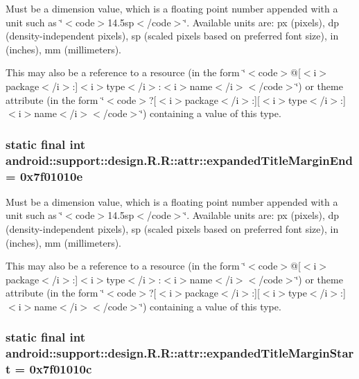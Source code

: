 Must be a dimension value, which is a floating point number appended with a unit such as \char`\"{}$<$code$>$14.5sp$<$/code$>$\char`\"{}. Available units are: px (pixels), dp (density-independent pixels), sp (scaled pixels based on preferred font size), in (inches), mm (millimeters). 

This may also be a reference to a resource (in the form \char`\"{}$<$code$>$@\mbox{[}$<$i$>$package$<$/i$>$:\mbox{]}$<$i$>$type$<$/i$>$:$<$i$>$name$<$/i$>$$<$/code$>$\char`\"{}) or theme attribute (in the form \char`\"{}$<$code$>$?\mbox{[}$<$i$>$package$<$/i$>$:\mbox{]}\mbox{[}$<$i$>$type$<$/i$>$:\mbox{]}$<$i$>$name$<$/i$>$$<$/code$>$\char`\"{}) containing a value of this type. \hypertarget{classandroid_1_1support_1_1design_1_1_r_1_1attr_4fbeb090f76db7ea478b4b3cd811b1bc}{
\subsubsection[{expandedTitleMarginEnd}]{\setlength{\rightskip}{0pt plus 5cm}static final int android::support::design.R.R::attr::expandedTitleMarginEnd = 0x7f01010e}}
\label{classandroid_1_1support_1_1design_1_1_r_1_1attr_4fbeb090f76db7ea478b4b3cd811b1bc}


Must be a dimension value, which is a floating point number appended with a unit such as \char`\"{}$<$code$>$14.5sp$<$/code$>$\char`\"{}. Available units are: px (pixels), dp (density-independent pixels), sp (scaled pixels based on preferred font size), in (inches), mm (millimeters). 

This may also be a reference to a resource (in the form \char`\"{}$<$code$>$@\mbox{[}$<$i$>$package$<$/i$>$:\mbox{]}$<$i$>$type$<$/i$>$:$<$i$>$name$<$/i$>$$<$/code$>$\char`\"{}) or theme attribute (in the form \char`\"{}$<$code$>$?\mbox{[}$<$i$>$package$<$/i$>$:\mbox{]}\mbox{[}$<$i$>$type$<$/i$>$:\mbox{]}$<$i$>$name$<$/i$>$$<$/code$>$\char`\"{}) containing a value of this type. \hypertarget{classandroid_1_1support_1_1design_1_1_r_1_1attr_d83ce78ec1a49df67be844b6d5023fe9}{
\subsubsection[{expandedTitleMarginStart}]{\setlength{\rightskip}{0pt plus 5cm}static final int android::support::design.R.R::attr::expandedTitleMarginStart = 0x7f01010c}}
\label{classandroid_1_1support_1_1design_1_1_r_1_1attr_d83ce78ec1a49df67be844b6d5023fe9}


